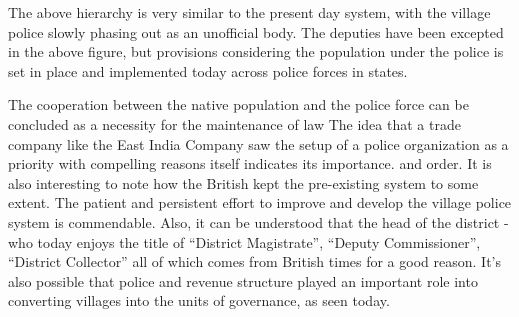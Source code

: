 \documentclass[a4paper]{article}
\begin{document}
The above hierarchy is very similar to the present day system,
with the village police slowly phasing out as an unofficial
body. The deputies have been excepted in the above figure, but
provisions considering the population under the police is set in
place and implemented today across police forces in states.

The cooperation between the native population and the police
force can be concluded as a necessity for the maintenance of law
The idea that a trade company like the East India Company saw
the setup of a police organization as a priority with compelling
reasons itself indicates its importance.  and order. It is also
interesting to note how the British kept the pre-existing system
to some extent. The patient and persistent effort to improve and
develop the village police system is commendable. Also, it can
be understood that the head of the district - who today enjoys
the title of ``District Magistrate'', ``Deputy Commissioner'',
``District Collector'' all of which comes from British times for
a good reason.  It's also possible that  police and revenue
structure played an important role into converting villages into
the units of governance, as seen today. 


\printbibliography 
\end{document}
